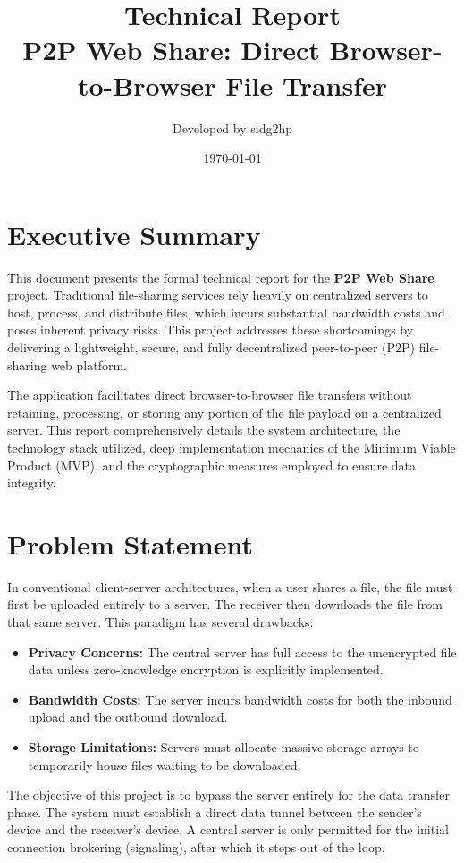 \documentclass[12pt, a4paper]{article}
\title{
    \vspace{2cm}
    \Huge \textbf{Technical Report} \\
    \vspace{0.5cm}
    \LARGE P2P Web Share: Direct Browser-to-Browser File Transfer \\
    \vspace{1.5cm}
}
\author{Developed by sidg2hp}
\date{\today}
\begin{document}
\maketitle
\thispagestyle{empty}
\newpage

\section{Executive Summary}
This document presents the formal technical report for the \textbf{P2P Web Share} project. Traditional file-sharing services rely heavily on centralized servers to host, process, and distribute files, which incurs substantial bandwidth costs and poses inherent privacy risks. This project addresses these shortcomings by delivering a lightweight, secure, and fully decentralized peer-to-peer (P2P) file-sharing web platform. 

The application facilitates direct browser-to-browser file transfers without retaining, processing, or storing any portion of the file payload on a centralized server. This report comprehensively details the system architecture, the technology stack utilized, deep implementation mechanics of the Minimum Viable Product (MVP), and the cryptographic measures employed to ensure data integrity.

\section{Problem Statement}
In conventional client-server architectures, when a user shares a file, the file must first be uploaded entirely to a server. The receiver then downloads the file from that same server. This paradigm has several drawbacks:
\begin{itemize}
    \item \textbf{Privacy Concerns:} The central server has full access to the unencrypted file data unless zero-knowledge encryption is explicitly implemented.
    \item \textbf{Bandwidth Costs:} The server incurs bandwidth costs for both the inbound upload and the outbound download.
    \item \textbf{Storage Limitations:} Servers must allocate massive storage arrays to temporarily house files waiting to be downloaded.
\end{itemize}
The objective of this project is to bypass the server entirely for the data transfer phase. The system must establish a direct data tunnel between the sender's device and the receiver's device. A central server is only permitted for the initial connection brokering (signaling), after which it steps out of the loop.
\end{document}
